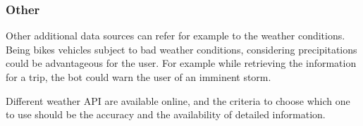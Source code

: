 \subsubsection{Other}
Other additional data sources can refer for example to the weather conditions. Being bikes vehicles subject to bad weather conditions, considering precipitations could be advantageous for the user. For example while retrieving the information for a trip, the bot could warn the user of an imminent storm.

Different weather API are available online, and the criteria to choose which one to use should be the accuracy and the availability of detailed information.

